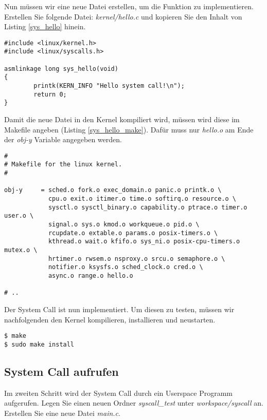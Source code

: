 Nun müssen wir eine neue Datei erstellen, um die Funktion zu implementieren. Erstellen Sie folgende Datei: \emph{kernel/hello.c}
und kopieren Sie den Inhalt von Listing \ref{sys_hello} hinein.

\begin{lstlisting}[label=sys_hello,caption=kernel/hello.c]
#include <linux/kernel.h>
#include <linux/syscalls.h>

asmlinkage long sys_hello(void)
{
        printk(KERN_INFO "Hello system call!\n");
        return 0;
}
\end{lstlisting}

Damit die neue Datei in den Kernel kompiliert wird, müssen wird diese im Makefile angeben (Listing \ref{sys_hello_make}).
Dafür muss nur \emph{hello.o} am Ende der \emph{obj-y} Variable angegeben werden.

\begin{lstlisting}[label=sys_hello_make,caption=kernel/Makefile]
#
# Makefile for the linux kernel.
#

obj-y     = sched.o fork.o exec_domain.o panic.o printk.o \
            cpu.o exit.o itimer.o time.o softirq.o resource.o \
            sysctl.o sysctl_binary.o capability.o ptrace.o timer.o user.o \
            signal.o sys.o kmod.o workqueue.o pid.o \
            rcupdate.o extable.o params.o posix-timers.o \
            kthread.o wait.o kfifo.o sys_ni.o posix-cpu-timers.o mutex.o \
            hrtimer.o rwsem.o nsproxy.o srcu.o semaphore.o \
            notifier.o ksysfs.o sched_clock.o cred.o \
            async.o range.o hello.o

# ..
\end{lstlisting}

Der System Call ist nun implementiert. Um diesen zu testen, müssen wir nachfolgenden den Kernel kompilieren,
installieren und neustarten.

\begin{lstlisting}
$ make
$ sudo make install
\end{lstlisting}

\subsection{System Call aufrufen}

Im zweiten Schritt wird der System Call durch ein Userspace Programm aufgerufen. Legen Sie einen neuen Ordner \emph{syscall\_test} unter
\emph{workspace/syscall} an. Erstellen Sie eine neue Datei \emph{main.c}. \\


